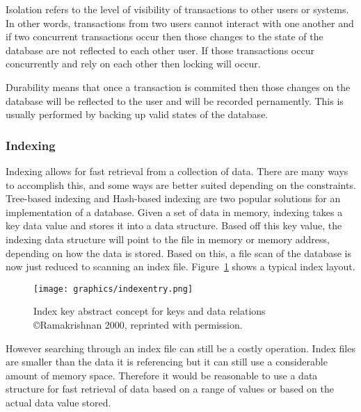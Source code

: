 \documentclass[letterpaper, 12pt]{article}
\begin{document}
Isolation refers to the level of visibility of transactions to other users or systems. In other words,
transactions from two users cannot interact with one another and if two concurrent transactions occur then
those changes to the state of the database are not reflected to each other user. If those transactions occur
concurrently and rely on each other then locking will occur.
\par\vspace{\baselineskip}

Durability means that once a transaction is commited then those changes on the database will be reflected to the user
and will be recorded pernamently. This is usually performed by backing up valid states of the database.
\par\vspace{\baselineskip}

\subsubsection{Indexing}
Indexing allows for fast retrieval from a collection of data. There are many ways to accomplish this,
and some ways are better suited depending on the constraints. Tree-based indexing and Hash-based indexing
are two popular solutions for an implementation of a database. Given a set of data in memory, indexing takes
a key data value and stores it into a data structure. Based off this key value, the indexing data structure
will point to the file in memory or memory address, depending on how the data is stored. Based on this, a
file scan of the database is now just reduced to scanning an index file. Figure~\ref{fig:index_entry} shows
a typical index layout.
\par\vspace{\baselineskip}

\begin{figure}
  \centering
  \texttt{[image: graphics/indexentry.png]}
  \caption{Index key abstract concept for keys and data relations \newline \copyright Ramakrishnan 2000, reprinted with permission.\cite{ramakrishnan2000database}}
  \label{fig:index_entry}
\end{figure}

However searching through an index file can still be a costly operation. Index files are smaller than the
data it is referencing but it can still use a considerable amount of memory space. Therefore it would be
reasonable to use a data structure for fast retrieval of data based on a range of values or based on
the actual data value stored.
\par\vspace{\baselineskip}
\end{document}
